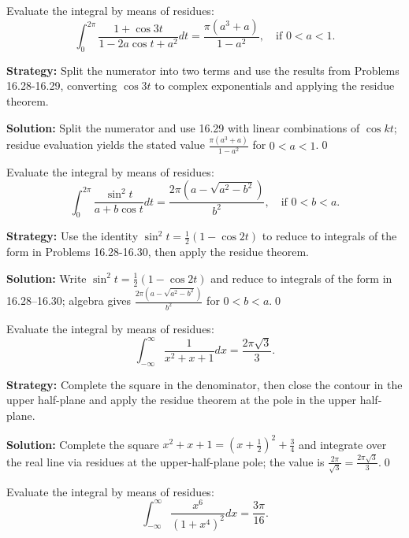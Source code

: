 \begin{problembox}
Evaluate the integral by means of residues:
\[ \int_0^{2\pi} \frac{1 + \cos 3t}{1 - 2a \cos t + a^2} dt = \frac{\pi (a^3 + a)}{1 - a^2}, \quad \text{if } 0 < a < 1. \]
\end{problembox}

\noindent\textbf{Strategy:} Split the numerator into two terms and use the results from Problems 16.28-16.29, converting \( \cos 3t \) to complex exponentials and applying the residue theorem.

\bigskip\noindent\textbf{Solution:}
Split the numerator and use 16.29 with linear combinations of $\cos kt$; residue evaluation yields the stated value $\frac{\pi(a^3+a)}{1-a^2}$ for $0<a<1$.\qed


\begin{problembox}
Evaluate the integral by means of residues:
\[ \int_0^{2\pi} \frac{\sin^2 t}{a + b \cos t} dt = \frac{2\pi (a - \sqrt{a^2 - b^2})}{b^2}, \quad \text{if } 0 < b < a. \]
\end{problembox}

\noindent\textbf{Strategy:} Use the identity \( \sin^2 t = \frac{1}{2}(1 - \cos 2t) \) to reduce to integrals of the form in Problems 16.28-16.30, then apply the residue theorem.

\bigskip\noindent\textbf{Solution:}
Write $\sin^2 t=\tfrac{1}{2}(1-\cos 2t)$ and reduce to integrals of the form in 16.28–16.30; algebra gives $\frac{2\pi(a-\sqrt{a^2-b^2})}{b^2}$ for $0<b<a$.\qed


\begin{problembox}
Evaluate the integral by means of residues:
\[ \int_{-\infty}^{\infty} \frac{1}{x^2 + x + 1} dx = \frac{2\pi \sqrt{3}}{3}. \]
\end{problembox}

\noindent\textbf{Strategy:} Complete the square in the denominator, then close the contour in the upper half-plane and apply the residue theorem at the pole in the upper half-plane.

\bigskip\noindent\textbf{Solution:}
Complete the square $x^2+x+1=(x+\tfrac12)^2+\tfrac34$ and integrate over the real line via residues at the upper-half-plane pole; the value is $\frac{2\pi}{\sqrt{3}}=\frac{2\pi\sqrt{3}}{3}$.\qed


\begin{problembox}
Evaluate the integral by means of residues:
\[ \int_{-\infty}^{\infty} \frac{x^6}{(1 + x^4)^2} dx = \frac{3\pi}{16}. \]
\end{problembox}

